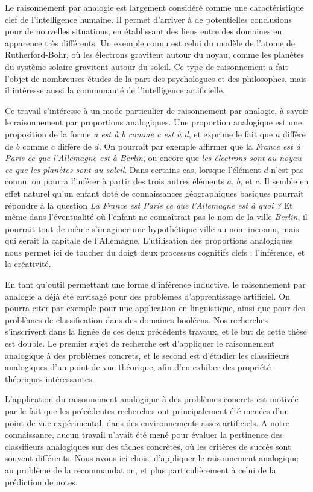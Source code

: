 Le raisonnement par analogie est largement considéré comme une caractéristique
clef de l'intelligence humaine. Il permet d'arriver à de potentielles
conclusions pour de nouvelles situations, en établissant des liens entre des
domaines en apparence très différents. Un exemple connu  est celui du modèle de
l'atome de Rutherford-Bohr, où les électrons gravitent autour du noyau, comme
les planètes du système solaire gravitent autour du soleil. Ce type de
raisonnement a fait l'objet de nombreuses études de la part des psychologues et
des philosophes, mais il intéresse aussi la communauté de l'intelligence
artificielle.

Ce travail s'intéresse à un mode particulier de raisonnement par analogie, à
savoir le raisonnement par proportions analogiques. Une proportion analogique
est une proposition de la forme \textit{a est à b comme c est à d}, et exprime
le fait que $a$ diffère de $b$ comme $c$ diffère de $d$. On pourrait par
exemple affirmer que la \textit{France est à Paris ce que l'Allemagne est à
Berlin}, ou encore que \textit{les électrons sont au noyau ce que les planètes
sont au soleil}. Dans certains cas, lorsque l'élément $d$ n'est pas connu, on
pourra l'inférer à partir des trois autres éléments $a$, $b$, et $c$. Il semble
en effet naturel qu'un enfant doté  de connaissances géographiques basiques
pourrait répondre à la question \textit{La France est Paris ce que l'Allemagne
est à quoi ?} Et même dans l'éventualité où l'enfant ne connaîtrait pas le nom
de la ville \textit{Berlin}, il pourrait tout de même s'imaginer une
hypothétique ville au nom inconnu, mais qui serait la capitale de l'Allemagne.
L'utilisation des proportions analogiques nous permet ici de toucher du doigt
deux processus cognitifs clefs : l'inférence, et la créativité.

En tant qu'outil permettant une forme d'inférence inductive, le raisonnement
par analogie a déjà été envisagé pour des problèmes d'apprentissage artificiel.
On pourra citer par exemple \cite{StrYvoCNLL05} pour une application en
linguistique, ainsi que \cite{BayMicDelIJCAI07} pour des problèmes de
classification dans des domaines booléens. Nos recherches s'inscrivent
dans la lignée de ces deux précédents travaux, et le but de cette thèse est
double. Le premier sujet de recherche est d'appliquer le raisonnement
analogique à des problèmes concrets, et le second est d'étudier les classifieurs
analogiques d'un point de vue théorique, afin d'en exhiber des propriété
théoriques intéressantes.

L'application du raisonnement analogique à des problèmes concrets est motivée
par le fait que les précédentes recherches ont principalement été menées d'un
point de vue expérimental, dans des environnements assez artificiels. A notre
connaissance, aucun travail n'avait été mené pour évaluer la pertinence des
classifieurs analogiques sur des tâches concrètes, où les critères de succès
sont souvent différents. Nous avons ici choisi d'appliquer le raisonnement
analogique au problème de la recommandation, et plus particulièrement à celui
de la prédiction de notes.

